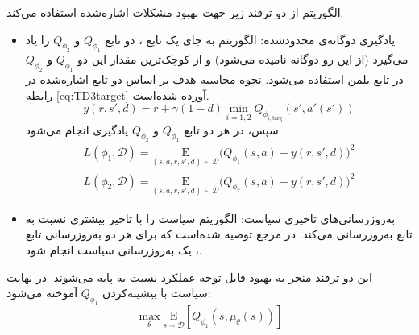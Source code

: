  
 الگوریتم
از دو ترفند زیر جهت بهبود مشکلات اشاره‌شده‌ استفاده می‌کند.
\begin{itemize}
	\item یادگیری دوگانه‌ی محدود‌شده:
	 الگوریتم 
	  به جای یک تابع ، دو تابع
	   \(Q_{\phi_1}\) و \(Q_{\phi_2}\)
	    را یاد می‌گیرد (از این رو دوگانه نامیده می‌شود) و از کوچک‌ترین مقدار این دو 
	     \(Q_{\phi_1}\) و \(Q_{\phi_2}\)
	      در تابع بلمن استفاده می‌شود. نحوه محاسبه هدف بر اساس دو تابع 
	       اشاره‌شده
	       در رابطه
	       \eqref{eq:TD3target}
	       آورده شده‌است.
	      \begin{equation}\label{eq:TD3target}
	      	y(r,s',d) = r + \gamma (1 - d) \min_{i=1,2} Q_{\phi_{i, \text{targ}}}(s', a'(s'))
	      \end{equation}
	      سپس، در هر دو تابع \(Q_{\phi_1}\) و \(Q_{\phi_2}\) یادگیری انجام می‌شود.
	      \begin{align}
	       L(\phi_1, {\mathcal D}) = 
	       	\underset{(s,a,r,s',d) \sim {\mathcal D}}{{\mathrm E}}
	       	{
	       	\Bigg( Q_{\phi_1}(s,a) - y(r,s',d) \Bigg)^2
	       }\\
	       L(\phi_2, {\mathcal D}) = \underset{(s,a,r,s',d) \sim {\mathcal D}}{{\mathrm E}}
	       	 {
	       	\Bigg( Q_{\phi_2}(s,a) - y(r,s',d) \Bigg)^2
	       }
	      \end{align}
	  \item به‌روزرسانی‌های تاخیری سیاست:
	   الگوریتم
	  سیاست را با تاخیر بیشتری نسبت به تابع  به‌روزرسانی می‌کند. در مرجع
	  \cite{TD3}
	   توصیه شده‌است که برای هر دو به‌روزرسانی تابع ، یک به‌روزرسانی سیاست انجام شود.
\end{itemize}
این دو ترفند منجر به بهبود قابل توجه عملکرد
 نسبت به  پایه می‌شوند.
 در نهایت سیاست با بیشینه‌کردن  \(Q_{\phi_1} \) آموخته می‌شود:
 \begin{equation}
	 \max_{\theta} \underset{s \sim {\mathcal D}}{{\mathrm E}}\left[ Q_{\phi_1}(s, \mu_{\theta}(s)) \right]
 \end{equation}
 

